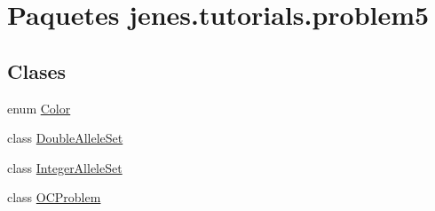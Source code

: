 \hypertarget{namespacejenes_1_1tutorials_1_1problem5}{\section{Paquetes jenes.\-tutorials.\-problem5}
\label{namespacejenes_1_1tutorials_1_1problem5}
}
\subsection*{Clases}
\begin{DoxyCompactItemize}
\item 
enum \hyperlink{enumjenes_1_1tutorials_1_1problem5_1_1_color}{Color}
\item 
class \hyperlink{classjenes_1_1tutorials_1_1problem5_1_1_double_allele_set}{Double\-Allele\-Set}
\item 
class \hyperlink{classjenes_1_1tutorials_1_1problem5_1_1_integer_allele_set}{Integer\-Allele\-Set}
\item 
class \hyperlink{classjenes_1_1tutorials_1_1problem5_1_1_o_c_problem}{O\-C\-Problem}
\end{DoxyCompactItemize}
